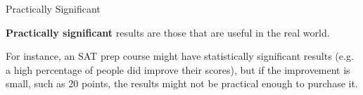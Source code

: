 \documentclass[t]{beamer}
\begin{document}
\begin{frame}{Practically Significant}
\begin{tcolorbox}[colframe=green!20!black, colback = green!30!white,title=\textbf{Practically Significant}]
\textbf{Practically significant} results are those that are useful in the real world.
\end{tcolorbox}
\vspace{8pt}	\pause

For instance, an SAT prep course might have statistically significant results (e.g. a high percentage of people did improve their scores), but if the improvement is small, such as 20 points, the results might not be practical enough to purchase it.
\end{frame}
\end{document}
